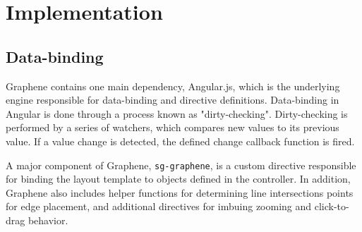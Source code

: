 \section{Implementation}

\subsection{Data-binding}
Graphene contains one main dependency, Angular.js, which is the underlying engine responsible for data-binding and directive definitions.
Data-binding in Angular is done through a process known as "dirty-checking".
Dirty-checking is performed by a series of watchers, which compares new values to its previous value. \autocite{google2014angularScope}
If a value change is detected, the defined change callback function is fired.

A major component of Graphene, \texttt{sg-graphene}, is a custom directive responsible for binding the layout template to objects defined in the controller.
In addition, Graphene also includes helper functions for determining line intersections points for edge placement, and additional directives for imbuing zooming and click-to-drag behavior.


